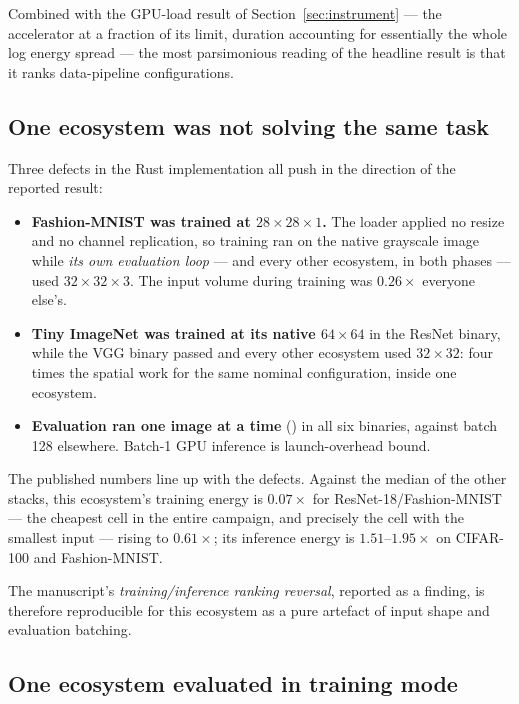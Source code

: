 Combined with the GPU-load result of Section~\ref{sec:instrument} --- the
accelerator at a fraction of its limit, duration accounting for essentially the
whole log energy spread --- the most parsimonious reading of the headline result
is that it ranks data-pipeline configurations.

\subsection{One ecosystem was not solving the same task}

Three defects in the Rust implementation all push in the direction of the
reported result:

\begin{itemize}\itemsep2pt
  \item \textbf{Fashion-MNIST was trained at \(28\times28\times1\).} The loader
        applied no resize and no channel replication, so training ran on the
        native grayscale image while \emph{its own evaluation loop} --- and every
        other ecosystem, in both phases --- used \(32\times32\times3\). The
         input volume during training was \(0.26\times\) everyone
        else's.
  \item \textbf{Tiny ImageNet was trained at its native \(64\times64\)} in the
        ResNet binary, while the VGG binary passed  and every
        other ecosystem used \(32\times32\): four times the spatial work for the
        same nominal configuration, inside one ecosystem.
  \item \textbf{Evaluation ran one image at a time} () in
        all six binaries, against batch 128 elsewhere. Batch-1 GPU inference is
        launch-overhead bound.
\end{itemize}

The published numbers line up with the defects. Against the median of the other
stacks, this ecosystem's training energy is \(0.07\times\) for
ResNet-18/Fashion-MNIST --- the cheapest cell in the entire campaign, and
precisely the cell with the smallest input --- rising to \(0.61\times\); its
inference energy is \(1.51\)--\(1.95\times\) on CIFAR-100 and Fashion-MNIST.

The manuscript's \emph{training/inference ranking reversal}, reported as a
finding, is therefore reproducible for this ecosystem as a pure artefact of input
shape and evaluation batching.

\subsection{One ecosystem evaluated in training mode}

